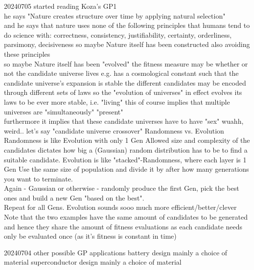 \documentclass{article}\usepackage[margin=2cm]{geometry}
\begin{document}
\begin{cascade}
    20240705
    \stepin
    started reading Koza's GP1\\
    he says "Nature creates structure over time by applying natural selection"\\
    and he says that nature uses none of the following principles that humans tend to do science with:
    \stepin
    correctness, consistency, justifiability, certainty, orderliness, parsimony, decisiveness
    \stepout
    so maybe Nature itself has been constructed also avoiding these principles \\
    so maybe Nature itself has been "evolved"
    \stepin
    the fitness measure may be whether or not the candidate universe lives
    \stepin
    e.g. has a cosmological constant such that the candidate universe's expansion is stable
    \stepout
    the different candidates may be encoded through different sets of laws
    \stepin
    so the "evolution of universes" in effect evolves its laws to be ever more stable, i.e. "living"
    \stepout
    this of course implies that multiple universes are "simultaneously" "present"\\
    furthermore it implies that these candidate universes have to have "sex"
    \stepin
    wuahh, weird.. let's say "candidate universe crossover"
    \stepout
    \stepout
    Randomness vs. Evolution
    \stepin
    Randomness is like Evolution with only 1 Gen
    \stepin
    Allowed size and complexity of the candidates dictates how big a (Gaussian) random distribution has to be to find a suitable candidate.
    \stepout
    Evolution is like "stacked"-Randomness, where each layer is 1 Gen
    \stepin
    Use the same size of population and divide it by after how many generations you want to terminate.\\
    Again - Gaussian or otherwise - randomly produce the first Gen, pick the best ones and build a new Gen "based on the best".\\
    Repeat for all Gens.
    \stepout
    Evolution sounds sooo much more efficient/better/clever
    \stepin
    Note that the two examples have the same amount of candidates to be generated\\
    and hence they share the amount of fitness evaluations as each candidate needs only be evaluated once (as it's fitness is constant in time)
\end{cascade}
\begin{cascade}
    20240704
    \stepin
    other possible GP applications
    \stepin
    battery design
    \stepin
    mainly a choice of material
    \stepout
    superconductor design
    \stepin
    mainly a choice of material
\end{cascade}
\end{document}
